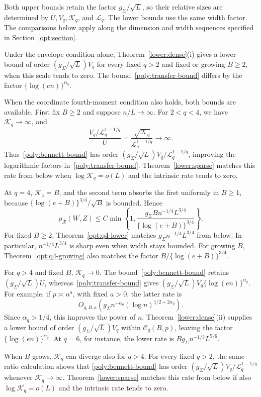 \documentclass[11pt,letterpaper]{article}
\newenvironment{vSixBlock}{\color{magenta}}{}
\theoremstyle{remark}
\newcommand{\rh}{\rho_{\mathcal R}}
\begin{document}
\begin{vSixBlock}
Both upper bounds retain the factor \(g_\Sigma/\sqrt L\), so
their relative sizes are determined by \(U,V_q,\mathcal K_q\),
and \(\mathcal L_q\). The lower bounds use the same width factor.
The comparisons below apply along the dimension and width sequences
specified in Section~\ref{opt:section}.

Under the envelope condition alone, Theorem~\ref{lower:dense}\textup{(i)}
gives a lower bound of order \((g_\Sigma/\sqrt L)V_q\) for
every fixed \(q>2\) and fixed or growing \(B\ge2\), when this
scale tends to zero. The bound~\eqref{poly:transfer-bound} differs
by the factor \(\{\log(en)\}^{\alpha_q}\).

When the coordinate fourth-moment condition also holds, both bounds
are available. First fix \(B\ge2\) and suppose \(n/L\to\infty\).
For \(2<q<4\), we have \(\mathcal K_q\to\infty\), and
\[
 \frac{V_q/\mathcal L_q^{1-1/q}}U
 =\frac{\sqrt{\mathcal K_q}}{\mathcal L_q^{1-1/q}}\to\infty.
\]
Thus~\eqref{poly:bennett-bound} has order
\((g_\Sigma/\sqrt L)V_q/\mathcal L_q^{1-1/q}\), improving
the logarithmic factors in~\eqref{poly:transfer-bound}.
Theorem~\ref{lower:sparse} matches this rate from below when
\(\log\mathcal K_q=o(L)\) and the intrinsic rate tends to zero.

At \(q=4\), \(\mathcal K_4=B\), and the second term absorbs
the first uniformly in \(B\ge1\), because
\(\{\log(e+B)\}^{3/4}/\sqrt B\) is bounded. Hence
\begin{equation}
 \rh(W,Z)\le C\min\left\{1,
 \frac{g_\Sigma Bn^{-1/4}L^{3/4}}
 {\{\log(e+B)\}^{3/4}}\right\}.
 \label{poly:q4}
\end{equation}
For fixed \(B\ge2\), Theorem~\ref{opt:q4-lower} matches
\(g_\Sigma n^{-1/4}L^{3/4}\) from below. In particular,
\(n^{-1/4}L^{3/4}\) is sharp even when width stays bounded.
For growing \(B\), Theorem~\ref{opt:q4-growing} also matches
the factor \(B/\{\log(e+B)\}^{3/4}\).

For \(q>4\) and fixed \(B\), \(\mathcal K_q\to0\).
The bound~\eqref{poly:bennett-bound} retains
\((g_\Sigma/\sqrt L)U\), whereas~\eqref{poly:transfer-bound}
gives \((g_\Sigma/\sqrt L)V_q\{\log(en)\}^{\alpha_q}\).
For example, if \(p\asymp n^a\), with fixed \(a>0\), the
latter rate is
\[
 O_{q,B,a}\!\left(g_\Sigma n^{-\alpha_q}
                    (\log n)^{1/2+2\alpha_q}\right).
\]
Since \(\alpha_q>1/4\), this improves the power of \(n\).
Theorem~\ref{lower:dense}\textup{(ii)} supplies a lower bound
of order \((g_\Sigma/\sqrt L)V_q\) within \(\mathcal C_q(B,p)\),
leaving the factor \(\{\log(en)\}^{\alpha_q}\). At \(q=6\),
for instance, the lower rate is \(Bg_\Sigma n^{-1/3}L^{5/6}\).

When \(B\) grows, \(\mathcal K_q\) can diverge also for \(q>4\).
For every fixed \(q>2\), the same ratio calculation shows that
\eqref{poly:bennett-bound} has order
\((g_\Sigma/\sqrt L)V_q/\mathcal L_q^{1-1/q}\) whenever
\(\mathcal K_q\to\infty\). Theorem~\ref{lower:sparse} matches
this rate from below if also \(\log\mathcal K_q=o(L)\) and
the intrinsic rate tends to zero.
\end{vSixBlock}
\end{document}
